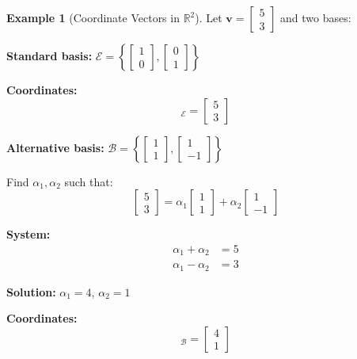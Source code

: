 \documentclass[12pt,a4paper]{article}
\theoremstyle{definition}
\newtheorem{example}{Example}[section]
\begin{document}
\begin{example}[Coordinate Vectors in $\mathbb{R}^2$]
Let $\mathbf{v} = \begin{bmatrix} 5 \\ 3 \end{bmatrix}$ and two bases:

\textbf{Standard basis:} $\mathcal{E} = \left\{\begin{bmatrix} 1 \\ 0 \end{bmatrix}, \begin{bmatrix} 0 \\ 1 \end{bmatrix}\right\}$

\textbf{Coordinates:}
\begin{equation}
[\mathbf{v}]_\mathcal{E} = \begin{bmatrix} 5 \\ 3 \end{bmatrix}
\end{equation}

\textbf{Alternative basis:} $\mathcal{B} = \left\{\begin{bmatrix} 1 \\ 1 \end{bmatrix}, \begin{bmatrix} 1 \\ -1 \end{bmatrix}\right\}$

Find $\alpha_1, \alpha_2$ such that:
\begin{equation}
\begin{bmatrix} 5 \\ 3 \end{bmatrix} = \alpha_1\begin{bmatrix} 1 \\ 1 \end{bmatrix} + \alpha_2\begin{bmatrix} 1 \\ -1 \end{bmatrix}
\end{equation}

\textbf{System:}
\begin{align}
\alpha_1 + \alpha_2 &= 5 \\
\alpha_1 - \alpha_2 &= 3
\end{align}

\textbf{Solution:} $\alpha_1 = 4$, $\alpha_2 = 1$

\textbf{Coordinates:}
\begin{equation}
[\mathbf{v}]_\mathcal{B} = \begin{bmatrix} 4 \\ 1 \end{bmatrix}
\end{equation}
\end{example}
\end{document}
